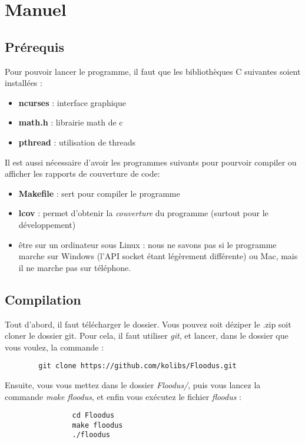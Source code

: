 \documentclass{FR16}
\begin{document}
\newpage






\section{Manuel}

\subsection{Prérequis}
Pour pouvoir lancer le programme, il faut que les bibliothèques C suivantes soient installées :
\begin{itemize}
    \item \textbf{ncurses} : interface graphique
    \item \textbf{math.h} : librairie math de c
    \item \textbf{pthread} : utilisation de threads
\end{itemize}

Il est aussi nécessaire d'avoir les programmes suivants pour pourvoir compiler ou afficher les rapports 
de couverture de code:
\begin{itemize}
 \item \textbf{Makefile} : sert pour compiler le programme
    \item \textbf{lcov} : permet d'obtenir la \textit{couverture} du programme (surtout pour le développement)
    \item être sur un ordinateur sous Linux : nous ne savons pas si le programme marche sur Windows (l'API socket étant légèrement différente) ou Mac, mais il ne marche pas sur téléphone.
\end{itemize}

\subsection{Compilation}
Tout d'abord, il faut télécharger le dossier. Vous pouvez soit déziper le .zip soit cloner le dossier git. Pour cela, il faut utiliser \textit{git}, et lancer, dans le dossier que vous voulez, la commande :

\begin{verbatim}
        git clone https://github.com/kolibs/Floodus.git
\end{verbatim}


Ensuite, vous vous mettez dans le dossier \textit{Floodus/}, puis vous lancez la commande \textit{make floodus}, et enfin vous exécutez le fichier \textit{floodus} :
\begin{verbatim}
                cd Floodus
                make floodus
                ./floodus
\end{verbatim}
\end{document}
